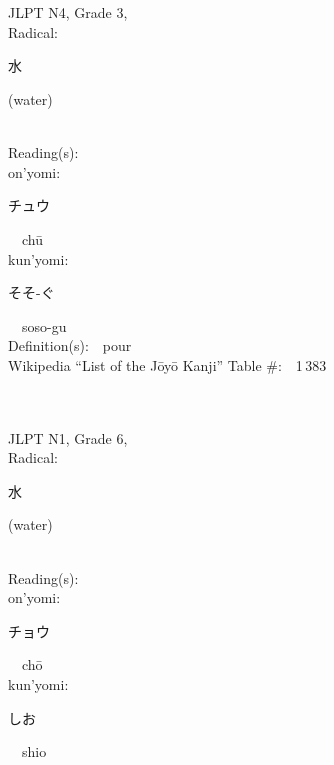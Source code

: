 \begin{multicols}{2}
\ \ \\
{\fontsize{34pt}{40pt}  }\ \ \\  %
{JLPT N4, Grade 3, \\Radical:\ \ {\begin{CJK}{UTF8}{min} 水 \end{CJK}} (water) } \\
Reading(s):\ \ \\
{\hspace*{1em}}on'yomi:\ \ \\
{\hspace*{2em}}{\begin{CJK}{UTF8}{min} チュウ \end{CJK}}\ \ ch\=u\ \ \\
{\hspace*{1em}}kun'yomi:\ \ \\
{\hspace*{2em}}{\begin{CJK}{UTF8}{min} そそ-ぐ \end{CJK}}\ \ soso-gu\ \ \\
Definition(s):\ \ pour \\
Wikipedia ``List of the J\=oy\=o Kanji'' Table \#:\ \ 1\,383 \\
\ \ \\
{\fontsize{34pt}{40pt}  }\ \ \\  %
{JLPT N1, Grade 6, \\Radical:\ \ {\begin{CJK}{UTF8}{min} 水 \end{CJK}} (water) } \\
Reading(s):\ \ \\
{\hspace*{1em}}on'yomi:\ \ \\
{\hspace*{2em}}{\begin{CJK}{UTF8}{min} チョウ \end{CJK}}\ \ ch\=o\ \ \\
{\hspace*{1em}}kun'yomi:\ \ \\
{\hspace*{2em}}{\begin{CJK}{UTF8}{min} しお \end{CJK}}\ \ shio\ \ \\

\end{multicols}
